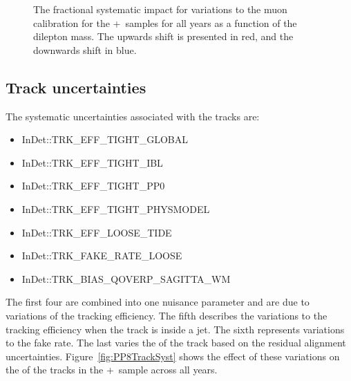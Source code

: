 \begin{figure}[h!]
  \caption{The fractional systematic impact for variations to the muon calibration for the \powheg+\pythia~samples for all years as a function of the dilepton mass. The upwards shift is presented in red, and the downwards shift in blue.}
  \label{fig:PP8MuCalSystmll}
\end{figure}

\subsection{Track uncertainties}

The systematic uncertainties associated with the tracks are:

\begin{itemize}
  \setlength{\itemsep}{1pt}\setlength{\parskip}{0pt}\setlength{\parsep}{0pt}
  \item InDet::TRK\_EFF\_TIGHT\_GLOBAL
  \item InDet::TRK\_EFF\_TIGHT\_IBL
  \item InDet::TRK\_EFF\_TIGHT\_PP0
  \item InDet::TRK\_EFF\_TIGHT\_PHYSMODEL
  \item InDet::TRK\_EFF\_LOOSE\_TIDE
  \item InDet::TRK\_FAKE\_RATE\_LOOSE
  \item InDet::TRK\_BIAS\_QOVERP\_SAGITTA\_WM
\end{itemize}

The first four are combined into one nuisance parameter and are due to variations of the tracking efficiency. The fifth describes the variations to the tracking efficiency when the track is inside a jet.
The sixth represents variations to the fake rate. The last varies the \pt of the track based on the residual alignment uncertainties. Figure~\ref{fig:PP8TrackSyst} shows the effect of these variations on the \pt of the tracks in the \powheg+\pythia~sample across all years.

